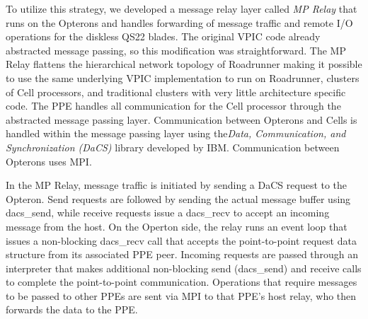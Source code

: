 \documentclass[10pt]{article}
\begin{document}





To utilize this strategy, we developed a message relay layer called
\emph{MP Relay} that runs on the Opterons and handles forwarding of
message traffic and remote I/O operations for the diskless QS22
blades.  The original VPIC code already abstracted message passing, so
this modification was straightforward.  The MP Relay flattens the
hierarchical network topology of Roadrunner making it possible to use
the same underlying VPIC implementation to run on Roadrunner, clusters
of Cell processors, and traditional clusters with very little
architecture specific code.  The PPE handles all communication for the
Cell processor through the abstracted message passing layer.
Communication between Opterons and Cells is handled within the message
passing layer using the\emph{Data, Communication, and Synchronization
(DaCS)} library developed by IBM.  Communication between Opterons uses
MPI.

In the MP Relay, message traffic is initiated by sending a DaCS
request to the Opteron.  Send requests are followed by sending the
actual message buffer using dacs\_send, while receive requests issue a
dacs\_recv to accept an incoming message from the host.  On the
Operton side, the relay runs an event loop that issues a non-blocking
dacs\_recv call that accepts the point-to-point request data structure
from its associated PPE peer.  Incoming requests are passed through an
interpreter that makes additional non-blocking send (dacs\_send) and
receive calls to complete the point-to-point communication.
Operations that require messages to be passed to other PPEs are sent
via MPI to that PPE's host relay, who then forwards the data to
the PPE.
\end{document}
